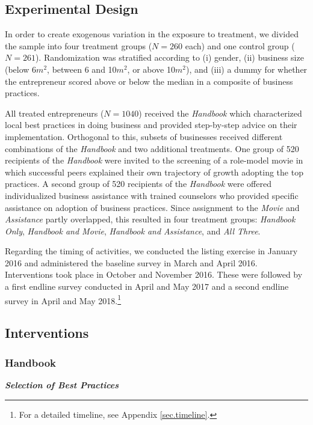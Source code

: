\documentclass[11.5pt]{article}
\begin{document}
\subsection{Experimental Design}

In order to create exogenous variation in the exposure to treatment, we divided the sample into four treatment groups ($N = 260$ each) and one control group ($N = 261$). Randomization was stratified according to (i) gender, (ii) business size (below 6$m^2$, between 6 and 10$m^2$, or above 10$m^2$), and (iii) a dummy for whether the entrepreneur scored above or below the median in a composite of business practices.

All treated entrepreneurs ($N = 1040$) received the \emph{Handbook} which characterized local best practices in doing business and provided step-by-step advice on their implementation. Orthogonal to this, subsets of businesses received different combinations of the \emph{Handbook} and two additional treatments. One group of 520 recipients of the \emph{Handbook} were invited to the screening of a role-model movie in which successful peers explained their own trajectory of growth adopting the top practices. A second group of 520 recipients of the \emph{Handbook} were offered individualized business assistance with trained counselors who provided specific assistance on adoption of business practices. Since assignment to the \emph{Movie} and \emph{Assistance} partly overlapped, this resulted in four treatment groups: \emph{Handbook Only}, \emph{Handbook and Movie}, \emph{Handbook and Assistance}, and \emph{All Three}.

Regarding the timing of activities, we conducted the listing exercise in January 2016 and administered the baseline survey in March and April 2016. Interventions took place in October and November 2016. These were followed by a first endline survey conducted in April and May 2017 and a second endline survey in April and May 2018.\footnote{For a detailed timeline, see Appendix \ref{sec.timeline}.
}

\subsection{Interventions}

\subsubsection{Handbook}

\emph{\textbf{Selection of Best Practices}}\
\end{document}
